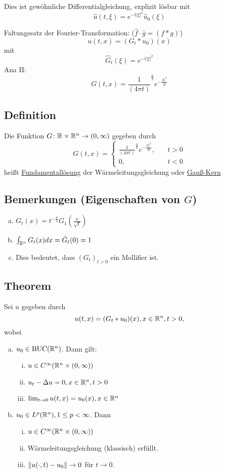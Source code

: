 Dies ist gewöhnliche Differentialgleichung, explizit lösbar mit
$$
\hat u (t, \xi) = e^{-t |\xi|^2} \hat u_0(\xi)
$$

Faltungssatz der Fourier-Transformation: ($\hat f \cdot \hat g = (f \ast g)^{\hat{}}$)
$$
  u(t,x) = (G_t \ast u_0)(x)
$$
mit
$$
\hat G_t(\xi) = e^{-t|\xi|^2}
$$
Ana II: 
$$
G(t,x) = \frac{1}{(4\pi t)}^{\frac{n}{2}} e^{-\frac{|\xi|^2}{4t}}
$$

\subsection{Definition}

Die Funktion $G \colon \mathbb{R} \times \mathbb{R}^n \to (0, \infty)$ gegeben durch
$$
G(t,x) = \begin{cases}
  \frac{1}{(4\pi t)}^{\frac{n}{2}} e^{-\frac{|\xi|^2}{4t}}, &\quad t > 0 \\
  0, &\quad t < 0
\end{cases}
$$
heißt \underline{Fundamentallösung} der Wärmeleitungsgleichung oder \underline{Gauß-Kern}

\subsection{Bemerkungen (Eigenschaften von $G$)}

\begin{enumerate}[a)]
  \item $G_t(x) = t^{-\frac{n}{2}} G_1\left(\frac{x}{\sqrt{t}}\right)$
  \item $\int_{\mathbb{R}^n} G_t(x) dx = \hat G_t(0) = 1$
  \item Dies bedeutet, dass $(G_t)_{t > 0}$ ein Mollifier ist.
\end{enumerate}

\subsection{Theorem}

Sei $u$ gegeben durch
$$
u(t,x) = (G_t \ast u_0)(x), x \in \mathbb{R}^n, t> 0,
$$
wobei
\begin{enumerate}[a)]
  \item $u_0 \in \operatorname{BUC}(\mathbb{R}^n)$. Dann gilt:
    \begin{enumerate}[(i)]
      \item $u \in C^\infty(\mathbb{R}^n \times (0,\infty))$
      \item $u_t - \Delta u = 0, x \in \mathbb{R}^n, t> 0$
      \item $\lim_{t \to 0} u(t,x) = u_0(x), x \in \mathbb{R}^n$
    \end{enumerate}
  \item $u_0 \in L^p(\mathbb{R}^n), 1 \leq p < \infty$. Dann
    \begin{enumerate}[(i)]
      \item $u \in C^\infty(\mathbb{R}^n \times (0, \infty))$
      \item Wärmeleitungsgleichung (klassisch) erfüllt.
      \item $\lVert u(\cdot, t) - u_0 \rVert \to 0$ für $t \to 0$.
    \end{enumerate}
\end{enumerate}

